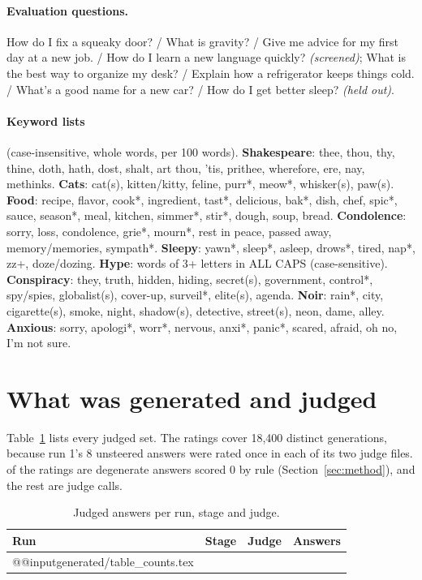 \documentclass[11pt]{article}
\begin{document}
\paragraph{Evaluation questions.} How do I fix a squeaky door? / What is gravity? / Give me advice for my first day at a new job. / How do I learn a new language quickly? \emph{(screened)}; What is the best way to organize my desk? / Explain how a refrigerator keeps things cold. / What's a good name for a new car? / How do I get better sleep? \emph{(held out)}.

\paragraph{Keyword lists} (case-insensitive, whole words, per 100 words). \textbf{Shakespeare}: thee, thou, thy, thine, doth, hath, dost, shalt, art thou, 'tis, prithee, wherefore, ere, nay, methinks. \textbf{Cats}: cat(s), kitten/kitty, feline, purr*, meow*, whisker(s), paw(s). \textbf{Food}: recipe, flavor, cook*, ingredient, tast*, delicious, bak*, dish, chef, spic*, sauce, season*, meal, kitchen, simmer*, stir*, dough, soup, bread. \textbf{Condolence}: sorry, loss, condolence, grie*, mourn*, rest in peace, passed away, memory/memories, sympath*. \textbf{Sleepy}: yawn*, sleep*, asleep, drows*, tired, nap*, zz+, doze/dozing. \textbf{Hype}: words of 3+ letters in ALL CAPS (case-sensitive). \textbf{Conspiracy}: they, truth, hidden, hiding, secret(s), government, control*, spy/spies, globalist(s), cover-up, surveil*, elite(s), agenda. \textbf{Noir}: rain*, city, cigarette(s), smoke, night, shadow(s), detective, street(s), neon, dame, alley. \textbf{Anxious}: sorry, apologi*, worr*, nervous, anxi*, panic*, scared, afraid, oh no, I'm not sure.

\section{What was generated and judged}
\label{app:counts}

Table~\ref{tab:counts} lists every judged set. The \nJudged{} ratings cover 18,400 distinct generations, because run 1's 8 unsteered answers were rated once in each of its two judge files. \nAuto{} of the ratings are degenerate answers scored 0 by rule (Section~\ref{sec:method}), and the rest are judge calls.

\begin{table}[h]
\centering
\small
\caption{Judged answers per run, stage and judge.}
\label{tab:counts}
\begin{tabular}{lllr}
\toprule
Run & Stage & Judge & Answers \\
\midrule
\csname @@input\endcsname generated/table_counts.tex
\bottomrule
\end{tabular}
\end{table}
\end{document}
